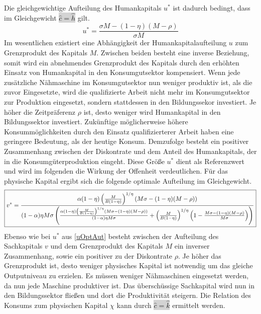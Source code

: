 %
Die gleichgewichtige Aufteilung des Humankapitals $u^*$ ist dadurch bedingt, dass im Gleichgewicht \colorbox{lightgray}{$\hat{c}=\hat{h}$} gilt.
%
\begin{equation}
	\boxed{u^*=\frac{\sigma M-(1-\eta)(M-\rho)}{\sigma M}}\label{uOptAut}
\end{equation}
%
Im wesentlichen existiert eine Abhängigkeit der Humankapitalaufteilung $u$ zum Grenzprodukt des Kapitals $M$. Zwischen beiden besteht eine inverse Beziehung, somit wird ein abnehmendes Grenzprodukt des Kapitals durch den erhöhten Einsatz von Humankapital in den Konsumgutsektor kompensiert. Wenn jede zusätzliche Nähmaschine im Konsumgutsektor nun weniger produktiv ist, als die zuvor Eingesetzte, wird die qualifizierte Arbeit nicht mehr im Konsumgutsektor zur Produktion eingesetzt, sondern stattdessen in den Bildungssekor investiert.  Je höher die Zeitpräferenz $\rho$ ist, desto weniger wird Humankapital in den Bildungssektor investiert. Zukünftige möglicherweise höhere Konsummöglichkeiten durch den Einsatz qualifizierterer Arbeit haben eine geringere Bedeutung, als der heutige Konsum. Demzufolge besteht ein positiver Zusammenhang zwischen der Diskontrate und dem Anteil des Humankapitals, der in die Konsumgüterproduktion eingeht. Diese Größe $u^*$ dient als Referenzwert und wird im folgenden die Wirkung der Offenheit verdeutlichen. 
Für das physische Kapital ergibt sich die folgende optimale Aufteilung im Gleichgewicht. 
%
\begin{equation}
	\boxed{%
		v^*=\frac{\alpha  (1-\eta ) \left(\frac{M}{B (1-\eta )}\right)^{1/\eta } (M \sigma -(1-\eta ) (M-\rho ))}{(1-\alpha ) \eta  M \sigma  \left(\frac{\alpha  (1-\eta ) \left(\frac{M}{B  (1-\eta )}\right)^{1/\eta } (M \sigma -(1-\eta ) (M-\rho ))}{(1-\alpha ) \eta  M \sigma }+\left(\frac{M}{B  (1-\eta )}\right)^{1/\eta } \left(1-\frac{M \sigma -(1-\eta ) (M-\rho )}{M \sigma }\right)\right)}%
		}
\end{equation}
%
Ebenso wie bei $u^*$ aus \eqref{uOptAut} besteht zwischen der Aufteilung des Sachkapitals $v$ und dem Grenzprodukt des Kapitals $M$ ein inverser Zusammenhang,
 sowie ein positiver zu der Diskontrate $\rho$. Je höher das Grenzprodukt ist, desto weniger physisches Kapital ist notwendig um das gleiche Outputniveau zu erzielen. Es müssen weniger Nähmaschinen eingesetzt werden, da nun jede Maschine produktiver ist. Das überschüssige Sachkapital wird nun in den Bildungssektor fließen und dort die Produktivität steigern. 
Die Relation des Konsums zum physischen Kapital $\chi$ kann durch \colorbox{lightgray}{$\hat{c}=\hat{k}$} ermittelt werden.
